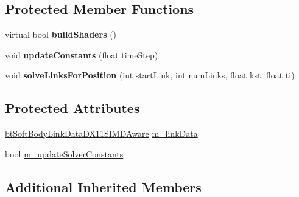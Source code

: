 \subsection*{Protected Member Functions}
\begin{DoxyCompactItemize}
\item 
\hypertarget{classbt_d_x11_s_i_m_d_aware_soft_body_solver_a370bf1175e4be8711daf9dcdb2ffdd9e}{virtual bool {\bfseries build\+Shaders} ()}\label{classbt_d_x11_s_i_m_d_aware_soft_body_solver_a370bf1175e4be8711daf9dcdb2ffdd9e}

\item 
\hypertarget{classbt_d_x11_s_i_m_d_aware_soft_body_solver_a4576ee44e738b592728890c05ae8b6f1}{void {\bfseries update\+Constants} (float time\+Step)}\label{classbt_d_x11_s_i_m_d_aware_soft_body_solver_a4576ee44e738b592728890c05ae8b6f1}

\item 
\hypertarget{classbt_d_x11_s_i_m_d_aware_soft_body_solver_af1749124332e58c27611ac90bb34f73e}{void {\bfseries solve\+Links\+For\+Position} (int start\+Link, int num\+Links, float kst, float ti)}\label{classbt_d_x11_s_i_m_d_aware_soft_body_solver_af1749124332e58c27611ac90bb34f73e}

\end{DoxyCompactItemize}
\subsection*{Protected Attributes}
\begin{DoxyCompactItemize}
\item 
\hyperlink{classbt_soft_body_link_data_d_x11_s_i_m_d_aware}{bt\+Soft\+Body\+Link\+Data\+D\+X11\+S\+I\+M\+D\+Aware} \hyperlink{classbt_d_x11_s_i_m_d_aware_soft_body_solver_a49c86a3bbaf2e70877057fa0d2059848}{m\+\_\+link\+Data}
\item 
bool \hyperlink{classbt_d_x11_s_i_m_d_aware_soft_body_solver_af027eb9f28bcc9069a003dd7867d0e0c}{m\+\_\+update\+Solver\+Constants}
\end{DoxyCompactItemize}
\subsection*{Additional Inherited Members}


